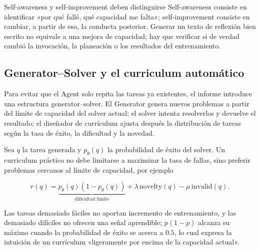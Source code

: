 \begin{importantbox}{Self-awareness y self-improvement deben distinguirse}
Self-awareness consiste en identificar «por qué fallé, qué capacidad me falta»; self-improvement consiste en cambiar, a partir de eso, la conducta posterior. Generar un texto de reflexión bien escrito no equivale a una mejora de capacidad; hay que verificar si de verdad cambió la invocación, la planeación o los resultados del entrenamiento.
\end{importantbox}



\subsection{Generator--Solver y el curriculum automático}

Para evitar que el Agent solo repita las tareas ya existentes, el informe introduce una estructura generator--solver. El Generator genera nuevos problemas a partir del límite de capacidad del solver actual; el solver intenta resolverlos y devuelve el resultado; el diseñador de currículum ajusta después la distribución de tareas según la tasa de éxito, la dificultad y la novedad.



Sea $q$ la tarea generada y $p_\theta(q)$ la probabilidad de éxito del solver. Un curriculum práctico no debe limitarse a maximizar la tasa de fallas, sino preferir problemas cercanos al límite de capacidad, por ejemplo

$$
r(q)=\underbrace{p_\theta(q)(1-p_\theta(q))}_{\text{dificultad límite}}
+\lambda\,\mathrm{novelty}(q)-\mu\,\mathrm{invalid}(q).
$$

Las tareas demasiado fáciles no aportan incremento de entrenamiento, y las demasiado difíciles no ofrecen una señal aprendible; $p(1-p)$ alcanza su máximo cuando la probabilidad de éxito se acerca a $0.5$, lo cual expresa la intuición de un currículum «ligeramente por encima de la capacidad actual».

